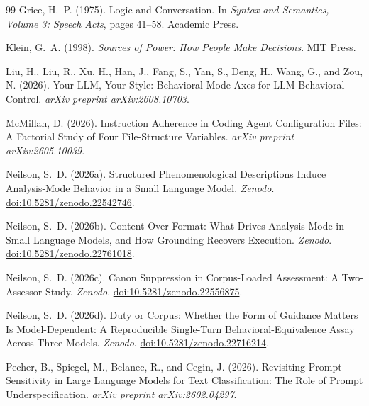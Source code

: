 \documentclass[11pt,a4paper]{article}
\begin{document}
\begin{thebibliography}{99}
Grice, H.~P. (1975).
\newblock Logic and Conversation.
\newblock In \emph{Syntax and Semantics, Volume 3: Speech Acts}, pages 41--58. Academic
  Press.

Klein, G.~A. (1998).
\newblock \emph{Sources of Power: How People Make Decisions}.
\newblock MIT Press.

Liu, H., Liu, R., Xu, H., Han, J., Fang, S., Yan, S., Deng, H., Wang, G., and Zou, N.
  (2026).
\newblock Your LLM, Your Style: Behavioral Mode Axes for LLM Behavioral Control.
\newblock \emph{arXiv preprint arXiv:2608.10703}.

McMillan, D. (2026).
\newblock Instruction Adherence in Coding Agent Configuration Files: A Factorial Study
  of Four File-Structure Variables.
\newblock \emph{arXiv preprint arXiv:2605.10039}.

Neilson, S.~D. (2026a).
\newblock Structured Phenomenological Descriptions Induce Analysis-Mode Behavior in a
  Small Language Model.
\newblock \emph{Zenodo}. \href{https://doi.org/10.5281/zenodo.22542746}{doi:10.5281/zenodo.22542746}.

Neilson, S.~D. (2026b).
\newblock Content Over Format: What Drives Analysis-Mode in Small Language Models, and
  How Grounding Recovers Execution.
\newblock \emph{Zenodo}. \href{https://doi.org/10.5281/zenodo.22761018}{doi:10.5281/zenodo.22761018}.

Neilson, S.~D. (2026c).
\newblock Canon Suppression in Corpus-Loaded Assessment: A Two-Assessor Study.
\newblock \emph{Zenodo}. \href{https://doi.org/10.5281/zenodo.22556875}{doi:10.5281/zenodo.22556875}.

Neilson, S.~D. (2026d).
\newblock Duty or Corpus: Whether the Form of Guidance Matters Is Model-Dependent: A
  Reproducible Single-Turn Behavioral-Equivalence Assay Across Three Models.
\newblock \emph{Zenodo}. \href{https://doi.org/10.5281/zenodo.22716214}{doi:10.5281/zenodo.22716214}.

Pecher, B., Spiegel, M., Belanec, R., and Cegin, J. (2026).
\newblock Revisiting Prompt Sensitivity in Large Language Models for Text
  Classification: The Role of Prompt Underspecification.
\newblock \emph{arXiv preprint arXiv:2602.04297}.


\end{thebibliography}
\end{document}
